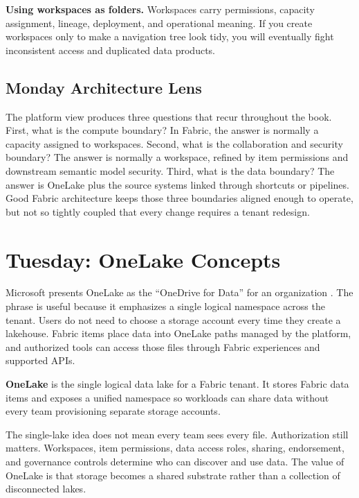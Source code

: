 \begin{pitfall}
\textbf{Using workspaces as folders.} Workspaces carry permissions, capacity assignment, lineage, deployment, and operational meaning. If you create workspaces only to make a navigation tree look tidy, you will eventually fight inconsistent access and duplicated data products.
\end{pitfall}

\subsection{Monday Architecture Lens}
The platform view produces three questions that recur throughout the book. First, what is the compute boundary? In Fabric, the answer is normally a capacity assigned to workspaces. Second, what is the collaboration and security boundary? The answer is normally a workspace, refined by item permissions and downstream semantic model security. Third, what is the data boundary? The answer is OneLake plus the source systems linked through shortcuts or pipelines. Good Fabric architecture keeps those three boundaries aligned enough to operate, but not so tightly coupled that every change requires a tenant redesign.

\section{Tuesday: OneLake Concepts}
Microsoft presents OneLake as the ``OneDrive for Data'' for an organization \cite{microsoftOneLakeOverview}. The phrase is useful because it emphasizes a single logical namespace across the tenant. Users do not need to choose a storage account every time they create a lakehouse. Fabric items place data into OneLake paths managed by the platform, and authorized tools can access those files through Fabric experiences and supported APIs.

\begin{definitionbox}
\textbf{OneLake} is the single logical data lake for a Fabric tenant. It stores Fabric data items and exposes a unified namespace so workloads can share data without every team provisioning separate storage accounts.
\end{definitionbox}

The single-lake idea does not mean every team sees every file. Authorization still matters. Workspaces, item permissions, data access roles, sharing, endorsement, and governance controls determine who can discover and use data. The value of OneLake is that storage becomes a shared substrate rather than a collection of disconnected lakes.

